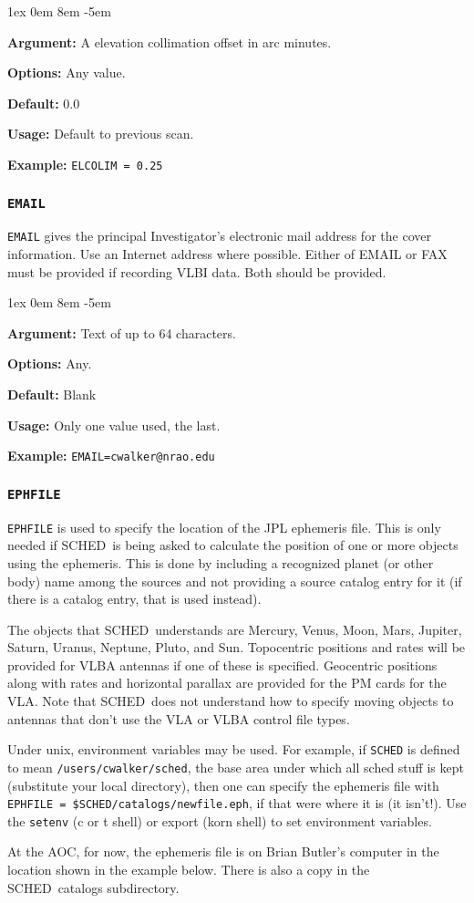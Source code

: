 \documentclass{report}
\newcommand{\schedb}{{\sc SCHED~}}
\newcommand{\rcwbox}[5]{
  \begin{list}{}{\parsep 1ex  \itemsep 0em
                 \leftmargin 8em  \itemindent -5em }
    \item {\bf Argument:} #1
    \item {\bf Options:}  #2
    \item {\bf Default:}  #3
    \item {\bf Usage:}    #4
    \item {\bf Example:}  #5
  \end{list}
}
\begin{document}
\rcwbox
{A elevation collimation offset in arc minutes.}
{Any value.}
{0.0}
{Default to previous scan.}
{{\tt ELCOLIM = 0.25 }}



\subsubsection{\label{MP:EMAIL}{\tt EMAIL}}

{\tt EMAIL} gives the principal Investigator's electronic mail
address for the cover information.  Use an Internet address where
possible.  Either of EMAIL or FAX must be provided if recording
VLBI data.  Both should be provided.

\rcwbox
{Text of up to 64 characters.}
{Any.}
{Blank}
{Only one value used, the last.}
{{\tt EMAIL=cwalker@nrao.edu}}

\subsubsection{\label{MP:EPHFILE}{\tt EPHFILE}}

{\tt EPHFILE} is used to specify the location of the JPL ephemeris
file.  This is only needed if \schedb is being asked to calculate
the position of one or more objects using the ephemeris.  This is
done by including a recognized planet (or other body) name among
the sources and not providing a source catalog entry for it (if there
is a catalog entry, that is used instead).

The objects that \schedb understands are Mercury, Venus, Moon, Mars,
Jupiter, Saturn, Uranus, Neptune, Pluto, and Sun.  Topocentric
positions and rates will be provided for VLBA antennas if one of
these is specified.  Geocentric positions along with rates and
horizontal parallax are provided for the PM cards for the VLA.
Note that \schedb does not understand how to specify moving objects
to antennas that don't use the VLA or VLBA control file types.

Under unix, environment variables may be used.  For example, if
{\tt SCHED} is defined to mean {\tt /users/cwalker/sched}, the
base area under which all sched stuff is kept (substitute your
local directory), then one can specify the ephemeris file with
{\tt EPHFILE = \$SCHED/catalogs/newfile.eph}, if that were where
it is (it isn't!).  Use the {\tt setenv}
(c or t shell) or export (korn shell) to set environment variables.

At the AOC, for now, the ephemeris file is on Brian Butler's
computer in the location shown in the example below.  There is
also a copy in the \schedb catalogs subdirectory.
\end{document}
